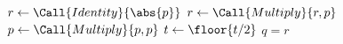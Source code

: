 \State $r\gets\Call{Identity}{\abs{p}}$
\State $r\gets\Call{Multiply}{r,p}$
\EndIf
\State $p\gets\Call{Multiply}{p,p}$
\State $t\gets\floor{t/2}$
\EndWhile
\State \Return $q=r$
\EndFunction